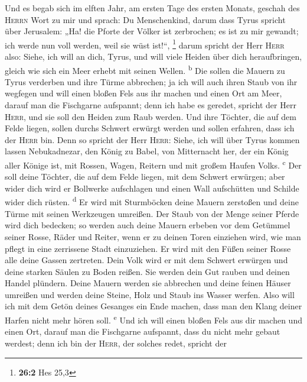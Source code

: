  Und es begab sich im elften Jahr, am ersten Tage des
ersten Monats, geschah des \textsc{Herrn} Wort zu mir und sprach:
 Du Menschenkind, darum dass Tyrus spricht über Jerusalem:
„Ha! die Pforte der Völker ist zerbrochen; es ist zu mir gewandt; ich
werde nun voll werden, weil sie wüst ist!{}``, \footnote{\textbf{26:2}
  Hes 25,3}  darum spricht der Herr \textsc{Herr} also:
Siehe, ich will an dich, Tyrus, und will viele Heiden über dich
heraufbringen, gleich wie sich ein Meer erhebt mit seinen Wellen.
\textsuperscript{b}  Die sollen die Mauern zu Tyrus
verderben und ihre Türme abbrechen; ja ich will auch ihren Staub von ihr
wegfegen und will einen bloßen Fels aus ihr machen  und
einen Ort am Meer, darauf man die Fischgarne aufspannt; denn ich habe es
geredet, spricht der Herr \textsc{Herr}, und sie soll den Heiden zum
Raub werden.  Und ihre Töchter, die auf dem Felde liegen,
sollen durchs Schwert erwürgt werden und sollen erfahren, dass ich der
\textsc{Herr} bin.  Denn so spricht der Herr
\textsc{Herr}: Siehe, ich will über Tyrus kommen lassen Nebukadnezar,
den König zu Babel, von Mitternacht her, der ein König aller Könige ist,
mit Rossen, Wagen, Reitern und mit großem Haufen Volks.
\textsuperscript{c}  Der soll deine Töchter, die auf dem
Felde liegen, mit dem Schwert erwürgen; aber wider dich wird er
Bollwerke aufschlagen und einen Wall aufschütten und Schilde wider dich
rüsten. \textsuperscript{d}  Er wird mit Sturmböcken deine
Mauern zerstoßen und deine Türme mit seinen Werkzeugen umreißen.
 Der Staub von der Menge seiner Pferde wird dich
bedecken; so werden auch deine Mauern erbeben vor dem Getümmel seiner
Rosse, Räder und Reiter, wenn er zu deinen Toren einziehen wird, wie man
pflegt in eine zerrissene Stadt einzuziehen.  Er wird mit
den Füßen seiner Rosse alle deine Gassen zertreten. Dein Volk wird er
mit dem Schwert erwürgen und deine starken Säulen zu Boden reißen.
 Sie werden dein Gut rauben und deinen Handel plündern.
Deine Mauern werden sie abbrechen und deine feinen Häuser umreißen und
werden deine Steine, Holz und Staub ins Wasser werfen. 
Also will ich mit dem Getön deines Gesanges ein Ende machen, dass man
den Klang deiner Harfen nicht mehr hören soll. \textsuperscript{e}
 Und ich will einen bloßen Fels aus dir machen und einen
Ort, darauf man die Fischgarne aufspannt, dass du nicht mehr gebaut
werdest; denn ich bin der \textsc{Herr}, der solches redet, spricht der
